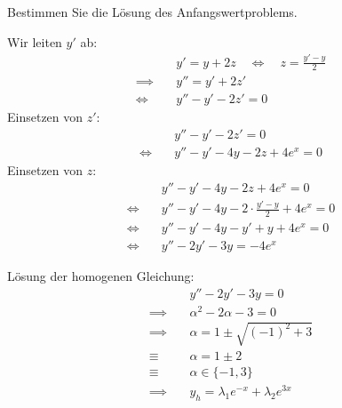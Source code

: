 \documentclass[answers]{exam}
\begin{document}
\begin{questions}
    Bestimmen Sie die Lösung des Anfangswertproblems.
    \begin{solution}
        Wir leiten $y'$ ab:
        $$
            \begin{aligned}
                               & y' = y + 2z \quad \iff \quad z = \frac{y'- y}{2} \\
                \implies \quad & y'' = y' + 2z'                                   \\
                \iff \quad     & y'' - y'  - 2z' = 0
            \end{aligned}
        $$
        Einsetzen von $z'$:
        $$
            \begin{aligned}
                           & y'' - y'  - 2z' = 0             \\
                \iff \quad & y'' - y'  - 4y -2z + 4e^{x} = 0
            \end{aligned}
        $$
        Einsetzen von $z$:
        $$
            \begin{aligned}
                           & y'' - y'  - 4y -2z + 4e^{x} = 0                     \\
                \iff \quad & y'' - y'  - 4y -2\cdot \frac{y'- y}{2} + 4e^{x} = 0 \\
                \iff \quad & y'' - y'  - 4y -y'+y + 4e^{x} = 0                   \\
                \iff \quad & y'' - 2y'  - 3y  = -4e^{x}
            \end{aligned}
        $$

        Lösung der homogenen Gleichung:
        $$
            \begin{aligned}
                               & y'' - 2y'  - 3y  = 0                          \\
                \implies \quad & \alpha^2 - 2\alpha - 3 = 0                    \\
                \implies \quad & \alpha = 1 \pm \sqrt{\left( -1 \right)^2 + 3} \\
                \equiv \quad   & \alpha = 1 \pm 2                              \\
                \equiv \quad   & \alpha \in \{-1, 3\}                          \\
                \implies \quad & y_h = \lambda_1e^{-x} + \lambda_2e^{3x}
            \end{aligned}
        $$


\end{solution}
\end{questions}
\end{document}
